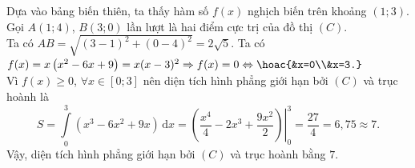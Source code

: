 \begin{ex}
{\begin{itemchoice}
			\itemch Dựa vào bảng biến thiên, ta thấy hàm số $f(x)$ nghịch biến trên khoảng $(1;3)$.
			\itemch Gọi $A(1;4)$, $B(3;0)$ lần lượt là hai điểm cực trị của đồ thị $(C)$.\\
			Ta có $AB=\sqrt{(3-1)^2+(0-4)^2}=2\sqrt{5}$.
			\itemch Ta có $f(x)=x\left(x^2-6x+9\right)=x(x-3)^2\Rightarrow f(x)=0\Leftrightarrow \hoac{&x=0\\&x=3.}$\\
			Vì $f(x)\geq 0$, $\forall x\in[0;3]$ nên diện tích hình phẳng giới hạn bởi $(C)$ và trục hoành là 
			\[S=\displaystyle\int\limits_0^3{\left(x^3-6x^2+9x\right)}\mathrm{\,d}x=\left.\left(\dfrac{x^4}{4}-2x^3+\dfrac{9x^2}{2}\right)\right|_0^3=\dfrac{27}{4}=6{,}75\approx 7.\]
			Vậy, diện tích hình phẳng giới hạn bởi $(C)$ và trục hoành bằng $7$.
		\end{itemchoice}
	}
\end{ex}


